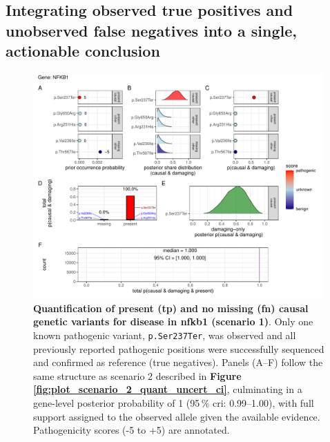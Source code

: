 \clearpage
\subsection{Integrating observed true positives and unobserved false negatives into a single, actionable conclusion}







\begin{figure}[h]
  \centering
  \includegraphics[width=0.99\textwidth]{../images/plot_scenario_1_quant_uncert_ci.pdf}
  \caption{
 \textbf{Quantification of present (\ac{tp}) and no missing (\ac{fn}) causal genetic variants for disease in \ac{nfkb1} (scenario 1)}.
  Only one known pathogenic variant, \texttt{p.Ser237Ter}, was observed and all previously reported pathogenic positions were successfully sequenced and confirmed as reference (true negatives).  
  Panels (A–F) follow the same structure as scenario 2 described in \textbf{Figure \ref{fig:plot_scenario_2_quant_uncert_ci}}, culminating in a gene-level posterior probability of 1 (95\,\% \ac{cri}: 0.99–1.00), with full support assigned to the observed allele given the available evidence. Pathogenicity scores (-5 to +5) are annotated.
  }
  \label{fig:plot_scenario_1_quant_uncert_ci}
\end{figure}

